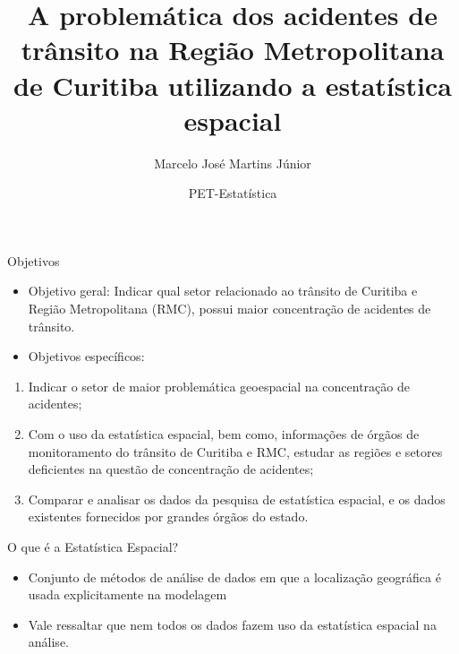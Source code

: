 \documentclass[ignorenonframetext,]{beamer}
\title{A problemática dos acidentes de trânsito na Região Metropolitana de
Curitiba utilizando a estatística espacial}
\author{Marcelo José Martins Júnior}
\date{PET-Estatística}
\providecommand{\tightlist}{%
  \setlength{\itemsep}{0pt}\setlength{\parskip}{0pt}}
\begin{document}
\frame{\titlepage}

\begin{frame}{Objetivos}

\begin{itemize}[<+->]
\item
  Objetivo geral: Indicar qual setor relacionado ao trânsito de Curitiba
  e Região Metropolitana (RMC), possui maior concentração de acidentes
  de trânsito.
\item
  Objetivos específicos:
\end{itemize}

\begin{enumerate}[<+->]
\def\labelenumi{\arabic{enumi}.}
\tightlist
\item
  Indicar o setor de maior problemática geoespacial na concentração de
  acidentes;
\item
  Com o uso da estatística espacial, bem como, informações de órgãos de
  monitoramento do trânsito de Curitiba e RMC, estudar as regiões e
  setores deficientes na questão de concentração de acidentes;
\item
  Comparar e analisar os dados da pesquisa de estatística espacial, e os
  dados existentes fornecidos por grandes órgãos do estado.
\end{enumerate}

\end{frame}

\begin{frame}{O que é a Estatística Espacial?}

\begin{itemize}[<+->]
\item
  Conjunto de métodos de análise de dados em que a localização
  geográfica é usada explicitamente na modelagem
\item
  Vale ressaltar que nem todos os dados fazem uso da estatística
  espacial na análise.
\end{itemize}

\end{frame}
\end{document}
